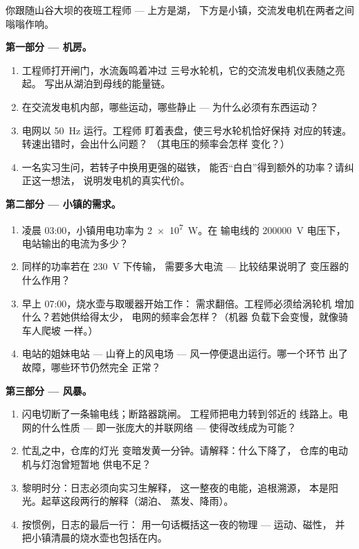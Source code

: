 \begin{problem}\label{pb:g9:alternator:1}
你跟随山谷大坝的夜班工程师 --- 上方是湖，
下方是小镇，交流发电机在两者之间嗡嗡作响。

\medskip\noindent\textbf{第一部分 --- 机房。}
\begin{enumerate}
  \item 工程师打开闸门，水流轰鸣着冲过
        三号水轮机，它的交流发电机仪表随之亮起。
        写出从湖泊到母线的能量链。
  \item 在交流发电机内部，哪些运动，哪些静止 ---
        为什么必须有东西运动？
  \item 电网以 \qty{50}{Hz} 运行。工程师
        盯着表盘，使三号水轮机恰好保持
        对应的转速。转速出错时，会出什么问题？
        （其电压的频率会怎样
        变化？）
  \item 一名实习生问，若转子中换用更强的磁铁，
        能否“白白”得到额外的功率？请纠正这一想法，
        说明发电机的真实代价。
\end{enumerate}

\medskip\noindent\textbf{第二部分 --- 小镇的需求。}
\begin{enumerate}[resume]
  \item 凌晨 03:00，小镇用电功率为 \qty{2e7}{W}。在
        输电线的 \qty{200000}{V} 电压下，
        电站输出的电流为多少？
  \item 同样的功率若在 \qty{230}{V} 下传输，
        需要多大电流 --- 比较结果说明了
        变压器的什么作用？
  \item 早上 07:00，烧水壶与取暖器开始工作：
        需求翻倍。工程师必须给涡轮机
        增加什么？若她供给得太少，
        电网的频率会怎样？（机器
        负载下会变慢，就像骑车人爬坡
        一样。）
  \item 电站的姐妹电站 --- 山脊上的风电场 ---
        风一停便退出运行。哪一个环节
        出了故障，哪些环节仍然完全
        正常？
\end{enumerate}

\medskip\noindent\textbf{第三部分 --- 风暴。}
\begin{enumerate}[resume]
  \item 闪电切断了一条输电线；断路器跳闸。
        工程师把电力转到邻近的
        线路上。电网的什么性质 ---
        即一张庞大的并联网络 --- 使得改线成为可能？
  \item 忙乱之中，仓库的灯光
        变暗发黄一分钟。请解释：什么下降了，
        仓库的电动机与灯泡曾短暂地
        供电不足？
  \item 黎明时分：日志必须向实习生解释，
        这一整夜的电能，追根溯源，
        本是阳光。起草这段两行的解释（湖泊、
        蒸发、降雨）。
  \item 按惯例，日志的最后一行：
        用一句话概括这一夜的物理 --- 运动、磁性，
        并把小镇清晨的烧水壶也包括在内。
\end{enumerate}
\end{problem}
